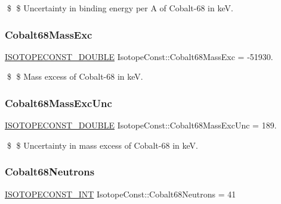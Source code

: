 \$ \$ Uncertainty in binding energy per A of Cobalt-\/68 in keV. \mbox{\label{group___isotope_const-_cobalt-_co68_ga75aa131d298075dddc71821de2e3a1d6}} 
\subsubsection{\texorpdfstring{Cobalt68\+Mass\+Exc}{Cobalt68MassExc}}
{\footnotesize\ttfamily \mbox{\hyperlink{group___isotope_const-_macros_ga8f45a7272ce02c0b4c65c44636ed719a}{I\+S\+O\+T\+O\+P\+E\+C\+O\+N\+S\+T\+\_\+\+D\+O\+U\+B\+LE}} Isotope\+Const\+::\+Cobalt68\+Mass\+Exc = -\/51930.}

\$ \$ Mass excess of Cobalt-\/68 in keV. \mbox{\label{group___isotope_const-_cobalt-_co68_gafa364f72980f957d73d17931ca70ba48}} 
\subsubsection{\texorpdfstring{Cobalt68\+Mass\+Exc\+Unc}{Cobalt68MassExcUnc}}
{\footnotesize\ttfamily \mbox{\hyperlink{group___isotope_const-_macros_ga8f45a7272ce02c0b4c65c44636ed719a}{I\+S\+O\+T\+O\+P\+E\+C\+O\+N\+S\+T\+\_\+\+D\+O\+U\+B\+LE}} Isotope\+Const\+::\+Cobalt68\+Mass\+Exc\+Unc = 189.}

\$ \$ Uncertainty in mass excess of Cobalt-\/68 in keV. \mbox{\label{group___isotope_const-_cobalt-_co68_gaf423cdd4d5efb6324f60f79f2ce1858e}} 
\subsubsection{\texorpdfstring{Cobalt68\+Neutrons}{Cobalt68Neutrons}}
{\footnotesize\ttfamily \mbox{\hyperlink{group___isotope_const-_macros_ga5f18360b3e99483a35c32d789e62621c}{I\+S\+O\+T\+O\+P\+E\+C\+O\+N\+S\+T\+\_\+\+I\+NT}} Isotope\+Const\+::\+Cobalt68\+Neutrons = 41}

